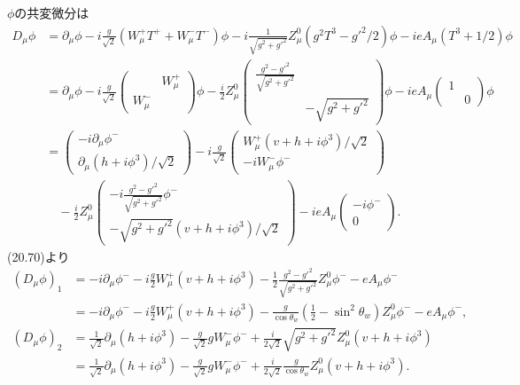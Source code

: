 \(\phi\)の共変微分は
\begin{align*}
  D_\mu \phi &= \partial_\mu \phi - i\frac{g}{\sqrt{2}} (W^+_\mu T^+ + W^-_\mu T^-) \phi
  - i \frac{1}{\sqrt{g^2+g'^2}} Z^0_\mu (g^2T^3 - g'^2/2) \phi - ie  A_\mu (T^3+1/2) \phi \\
  &= \partial_\mu \phi - i\frac{g}{\sqrt{2}}
  \begin{pmatrix}
    & W^+_\mu \\ W^-_\mu &
  \end{pmatrix}
  \phi - \frac{i}{2} Z^0_\mu
  \begin{pmatrix}
    \frac{g^2-g'^2}{\sqrt{g^2+g'^2}} & \\ & - \sqrt{g^2+g'^2}
  \end{pmatrix}
  \phi
  -i e A_\mu
  \begin{pmatrix}
    1 & \\ & 0
  \end{pmatrix}
  \phi \\
  &=
  \begin{pmatrix}
    -i \partial_\mu\phi^- \\
    \partial_\mu(h+i\phi^3)/\sqrt{2}
  \end{pmatrix}
  - i\frac{g}{\sqrt{2}}
  \begin{pmatrix}
    W^+_\mu (v+h+i\phi^3)/\sqrt{2} \\
    -i W^-_\mu \phi^-
  \end{pmatrix}
  \\
  &\quad - \frac{i}{2} Z^0_\mu
  \begin{pmatrix}
    -i \frac{g^2-g'^2}{\sqrt{g^2+g'^2}} \phi^- \\[5pt]
    - \sqrt{g^2+g'^2} (v+h+i\phi^3)/\sqrt{2}
  \end{pmatrix}
  -i e A_\mu
  \begin{pmatrix}
    -i \phi^- \\ 0
  \end{pmatrix}
  .
\end{align*}
(20.70)より
\begin{align*}
  (D_\mu\phi)_1 &= - i\partial_\mu\phi^- - i\frac{g}{2} W^+_\mu (v+h+i\phi^3)
  - \frac{1}{2} \frac{g^2-g'^2}{\sqrt{g^2+g'^2}} Z^0_\mu \phi^- - eA_\mu\phi^- \\
  &= - i\partial_\mu\phi^- - i\frac{g}{2} W^+_\mu (v+h+i\phi^3)
  - \frac{g}{\cos\theta_w} \left( \frac{1}{2} - \sin^2\theta_w \right) Z^0_\mu \phi^- - eA_\mu\phi^- , \\
  (D_\mu\phi)_2 &= \frac{1}{\sqrt{2}} \partial_\mu(h+i\phi^3) - \frac{g}{\sqrt{2}} g W^-_\mu \phi^-
  + \frac{i}{2\sqrt{2}} \sqrt{g^2+g'^2} Z^0_\mu (v+h+i\phi^3) \\
  &= \frac{1}{\sqrt{2}} \partial_\mu(h+i\phi^3) - \frac{g}{\sqrt{2}} g W^-_\mu \phi^-
  + \frac{i}{2\sqrt{2}} \frac{g}{\cos\theta_w} Z^0_\mu (v+h+i\phi^3) .
\end{align*}
